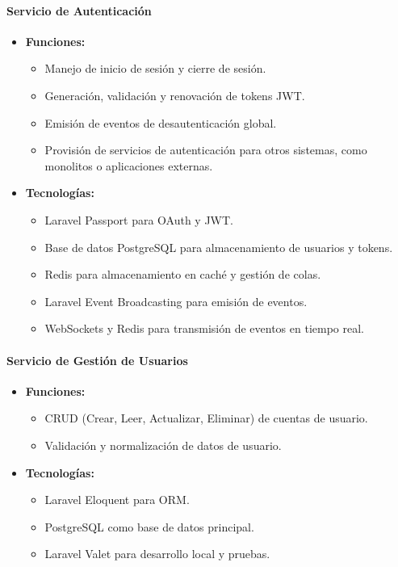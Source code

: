 \paragraph{Servicio de Autenticación}
\begin{itemize}
    \item \textbf{Funciones:}
          \begin{itemize}
              \item Manejo de inicio de sesión y cierre de sesión.
              \item Generación, validación y renovación de tokens JWT.
              \item Emisión de eventos de desautenticación global.
              \item Provisión de servicios de autenticación para otros sistemas, como monolitos o aplicaciones externas.
          \end{itemize}
    \item \textbf{Tecnologías:}
          \begin{itemize}
              \item Laravel Passport para OAuth y JWT.
              \item Base de datos PostgreSQL para almacenamiento de usuarios y tokens.
              \item Redis para almacenamiento en caché y gestión de colas.
              \item Laravel Event Broadcasting para emisión de eventos.
              \item WebSockets y Redis para transmisión de eventos en tiempo real.
          \end{itemize}
\end{itemize}

\paragraph{Servicio de Gestión de Usuarios}
\begin{itemize}
    \item \textbf{Funciones:}
          \begin{itemize}
              \item CRUD (Crear, Leer, Actualizar, Eliminar) de cuentas de usuario.
              \item Validación y normalización de datos de usuario.
          \end{itemize}
    \item \textbf{Tecnologías:}
          \begin{itemize}
              \item Laravel Eloquent para ORM.
              \item PostgreSQL como base de datos principal.
              \item Laravel Valet para desarrollo local y pruebas.
          \end{itemize}
\end{itemize}

